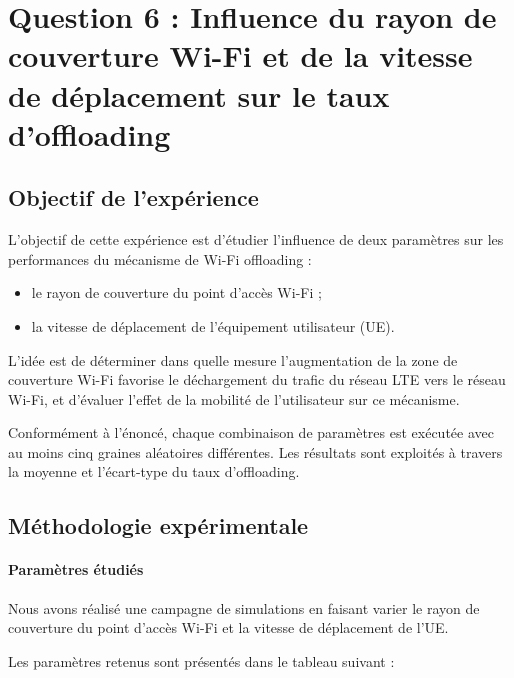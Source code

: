 
\section{Question 6 : Influence du rayon de couverture Wi-Fi
et de la vitesse de déplacement sur le taux d'offloading}

\subsection{Objectif de l'expérience}

L'objectif de cette expérience est d'étudier l'influence de deux
paramètres sur les performances du mécanisme de Wi-Fi offloading :

\begin{itemize}
\item le rayon de couverture du point d'accès Wi-Fi ;
\item la vitesse de déplacement de l'équipement utilisateur (UE).
\end{itemize}

L'idée est de déterminer dans quelle mesure l'augmentation
de la zone de couverture Wi-Fi favorise le déchargement du trafic
du réseau LTE vers le réseau Wi-Fi, et d'évaluer l'effet de la
mobilité de l'utilisateur sur ce mécanisme.

Conformément à l'énoncé, chaque combinaison de paramètres est
exécutée avec au moins cinq graines aléatoires différentes.
Les résultats sont exploités à travers la moyenne et l'écart-type
du taux d'offloading.

\subsection{Méthodologie expérimentale}

\paragraph{Paramètres étudiés}

Nous avons réalisé une campagne de simulations en faisant varier
le rayon de couverture du point d'accès Wi-Fi et la vitesse
de déplacement de l'UE.

Les paramètres retenus sont présentés dans le tableau suivant :

